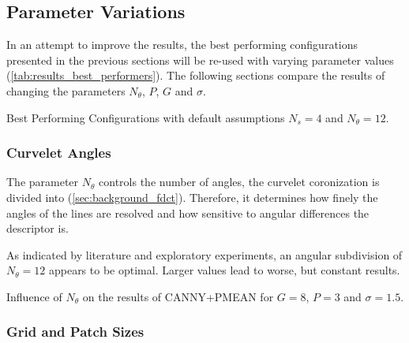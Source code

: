 \subsection{Parameter Variations}\label{sec:results_parameters}

In an attempt to improve the results, the best performing configurations
presented in the previous sections will be re-used with varying parameter
values (\autoref{tab:results_best_performers}). The following sections compare
the results of changing the parameters $N_{\theta}$, $P$, $G$ and $\sigma$.

\begin{table}[h]
    \centering
    \resultsbestperformers
    \caption[Best Performing Configurations]{
        Best Performing Configurations with default assumptions $N_s=4$ and
        $N_{\theta}=12$.
    }
    \label{tab:results_best_performers}
\end{table}

\FloatBarrier
\subsubsection{Curvelet Angles}

The parameter $N_{\theta}$ controls the number of angles, the curvelet
coronization is divided into (\autoref{sec:background_fdct}).  Therefore, it
determines how finely the angles of the lines are resolved and how sensitive to
angular differences the descriptor is.

As indicated by literature and exploratory experiments, an angular subdivision
of $N_{\theta} = 12$ appears to be optimal. Larger values lead to worse, but
constant results.

\begin{table}[h]
    \centering
    \resultsparameterangles
    \caption[Angle Parameter Results]{
        Influence of $N_{\theta}$ on the results of CANNY+PMEAN for $G=8$,
        $P=3$ and $\sigma=1.5$.
    }
    \label{tab:results_parameter_angles}
\end{table}

\FloatBarrier
\subsubsection{Grid and Patch Sizes}

